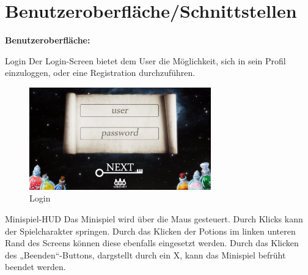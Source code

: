 
\chapter{Benutzeroberfläche/Schnittstellen}
\textbf{Benutzeroberfläche:}\\
%

\begin{ui}{10}{Login}
Der Login-Screen bietet dem User die Möglichkeit, sich in sein Profil einzuloggen, oder eine Registration durchzuführen.
\begin{figure}[ht]
\centering
\includegraphics[width=0.7\textwidth]{figures/login_screen.png}
\caption{Login}
\label{gui}
\end{figure}
\end{ui}

\begin{ui}{30}{Minispiel-HUD}
Das Minispiel wird über die Maus gesteuert. Durch Klicks kann der Spielcharakter springen. Durch das Klicken der Potions im linken
unteren Rand des Screens können diese ebenfalls eingesetzt werden.
Durch das Klicken des „Beenden“-Buttons, dargstellt durch ein X, kann das Minispiel befrüht beendet werden.
\end{ui}

